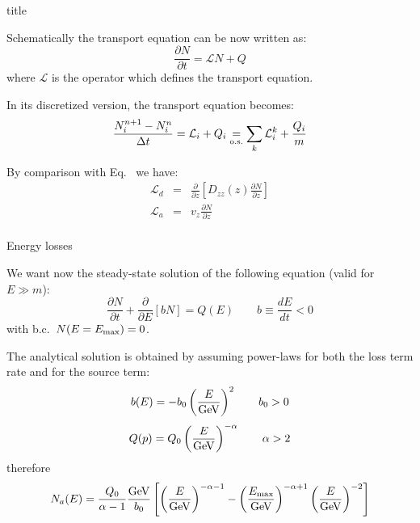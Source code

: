 \documentclass[9pt]{beamer}
\begin{document}
\begin{frame}{title}

Schematically the transport equation can be now written as:
%
\begin{equation*}
\frac{\partial N}{\partial t} = {\mathcal L}N + Q
\end{equation*}
%
where ${\mathcal L}$ is the operator which defines the transport equation.

In its discretized version, the transport equation becomes:
%
\begin{equation*} 
\frac{N_i^{n+1} - N_i^n}{\Delta t} = {\mathcal L}_i + Q_i \underset{\rm o.s.}{=}
 \sum_k {\mathcal L}_i^k + \frac{Q_i}{m} 
\end{equation*}

By comparison with Eq.~ we have:
%
\begin{eqnarray*}
{\mathcal L}_d & = & \frac{\partial}{\partial z} \left[ D_{zz}(z) \frac{\partial N}{\partial z} \right]\\
{\mathcal L}_a & = & v_z \frac{\partial N}{\partial z} \\
\end{eqnarray*}

\end{frame}

\begin{frame}{Energy losses}

We want now the steady-state solution of the following equation (valid for $E \gg m$):
%
\begin{equation*}
\frac{\partial N}{\partial t} + \frac{\partial}{\partial E} \left[ b N \right] = Q(E) \qquad b \equiv \frac{dE}{dt} < 0
\end{equation*}
%
with b.c.~$N(E = E_{\rm max}) = 0$.

The analytical solution is obtained by assuming power-laws for both the loss term rate and for the source term:
%
\begin{equation*}
b(E) = -b_0 \left( \frac{E}{\rm GeV} \right)^2 \qquad b_0 > 0
\end{equation*}
%
\begin{equation*}
Q(p) = Q_0 \left( \frac{E}{\rm GeV} \right)^{-\alpha} \qquad \alpha > 2
\end{equation*}
%
therefore
%
\begin{equation*}
N_a(E) = \frac{Q_0}{\alpha - 1} \frac{\rm GeV}{b_0} \left[ \left( \frac{E}{\rm GeV} \right)^{-\alpha-1} - \left( \frac{E_{\rm max}}{\rm GeV} \right)^{-\alpha + 1} \left( \frac{E}{\rm GeV} \right)^{-2} \right]
\end{equation*}

\end{frame}
\end{document}
